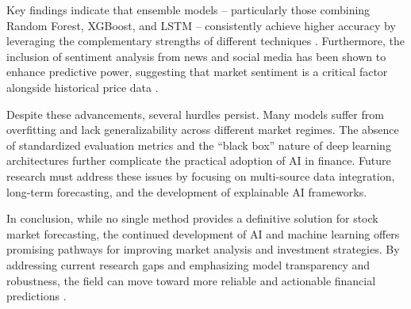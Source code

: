 \documentclass[11pt,a4paper]{article}
\begin{document}
Key findings indicate that ensemble models -- particularly those combining Random Forest, XGBoost,
and LSTM -- consistently achieve higher accuracy by leveraging the complementary strengths of
different techniques \cite{sizan2023,sonkavde2023}. Furthermore, the inclusion of sentiment analysis
from news and social media has been shown to enhance predictive power, suggesting that market
sentiment is a critical factor alongside historical price data \cite{khan2022,koukaras2022}.

Despite these advancements, several hurdles persist. Many models suffer from overfitting and lack
generalizability across different market regimes. The absence of standardized evaluation metrics and
the ``black box'' nature of deep learning architectures further complicate the practical adoption of AI
in finance. Future research must address these issues by focusing on multi-source data integration,
long-term forecasting, and the development of explainable AI frameworks.

In conclusion, while no single method provides a definitive solution for stock market forecasting, the
continued development of AI and machine learning offers promising pathways for improving market
analysis and investment strategies. By addressing current research gaps and emphasizing model
transparency and robustness, the field can move toward more reliable and actionable financial
predictions \cite{strader2020,chopra2021,lin2024}.
\end{document}
